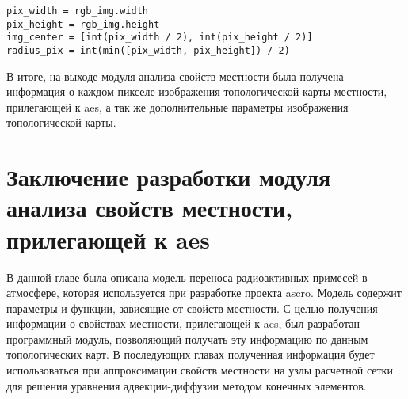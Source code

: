 \begin{lstlisting}[caption=Получение дополнительных параметров изображения топологической карты., label={lst_add_params}]
pix_width = rgb_img.width
pix_height = rgb_img.height
img_center = [int(pix_width / 2), int(pix_height / 2)]
radius_pix = int(min([pix_width, pix_height]) / 2)
\end{lstlisting}

В итоге, на выходе модуля анализа свойств местности была получена информация о каждом пикселе изображения топологической 
карты местности, прилегающей к \ac{aes}, а так же дополнительные параметры изображения топологической карты.

\section{Заключение разработки модуля анализа свойств местности, прилегающей к \ac{aes}}

В данной главе была описана модель переноса радиоактивных примесей в атмосфере, которая используется при разработке 
проекта \ac{ascro}. Модель содержит параметры и функции, зависящие от свойств местности. С целью получения информации о 
свойствах местности, прилегающей к \ac{aes}, был разработан программный модуль, позволяющий получать эту информацию по 
данным топологических карт. В последующих главах полученная информация будет использоваться при аппроксимации свойств 
местности на узлы расчетной сетки для решения уравнения адвекции-диффузии методом конечных элементов.